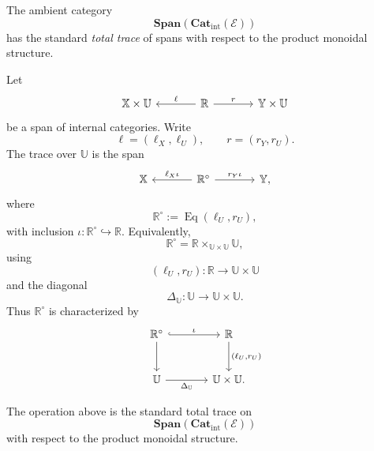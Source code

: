 The ambient category
\[
\mathbf{Span}(\mathbf{Cat}_{\mathrm{int}}(\mathcal E))
\]
has the standard \emph{total trace} of spans with respect to the product
monoidal structure.

Let
\[
\begin{tikzcd}[column sep=large]
\mathbb X\times\mathbb U
&
\mathbb R
  \arrow[l, "\ell"']
  \arrow[r, "r"]
&
\mathbb Y\times\mathbb U
\end{tikzcd}
\]
be a span of internal categories.  Write
\[
\ell=(\ell_X,\ell_U),
\qquad
r=(r_Y,r_U).
\]
The trace over \(\mathbb U\) is the span
\[
\begin{tikzcd}[column sep=large]
\mathbb X
&
\mathbb R^\circ
  \arrow[l, "\ell_X\iota"']
  \arrow[r, "r_Y\iota"]
&
\mathbb Y,
\end{tikzcd}
\]
where
\[
\mathbb R^\circ
:=
\operatorname{Eq}(\ell_U,r_U),
\]
with inclusion \(\iota:\mathbb R^\circ\hookrightarrow\mathbb R\).  Equivalently,
\[
\mathbb R^\circ
=
\mathbb R\times_{\mathbb U\times\mathbb U}\mathbb U,
\]
using
\[
(\ell_U,r_U):\mathbb R\to\mathbb U\times\mathbb U
\]
and the diagonal
\[
\Delta_{\mathbb U}:\mathbb U\to\mathbb U\times\mathbb U.
\]
Thus \(\mathbb R^\circ\) is characterized by
\[
\begin{tikzcd}[column sep=large,row sep=large]
\mathbb R^\circ
  \arrow[r, hook, "\iota"]
  \arrow[d]
&
\mathbb R
  \arrow[d, "{(\ell_U,r_U)}"]
\\
\mathbb U
  \arrow[r, "\Delta_{\mathbb U}"']
&
\mathbb U\times\mathbb U .
\end{tikzcd}
\]

\begin{proposition}
\label{prop:ambient-span-total-trace}
The operation above is the standard total trace on
\[
\mathbf{Span}(\mathbf{Cat}_{\mathrm{int}}(\mathcal E))
\]
with respect to the product monoidal structure.
\end{proposition}

